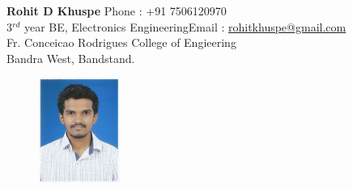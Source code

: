 \documentclass[a4paper]{article}
\begin{document}
	\begin{flushleft}
		\textbf{Rohit D Khuspe} \hfill{Phone : +91 7506120970}\\
		3$^{rd}$ year BE, Electronics Engineering\hfill{Email : \underline{rohitkhuspe@gmail.com}}\\
		Fr. Conceicao Rodrigues College of Engieering\\
		Bandra West, Bandstand.\\ 
		
			
	\end{flushleft}

		\begin{figure}[h]
			\begin{flushright}
				\vspace{-0.5in}
				\includegraphics[width=100px]{khuspe.png}
			\end{flushright}
		\end{figure}
	
		
\end{document}
